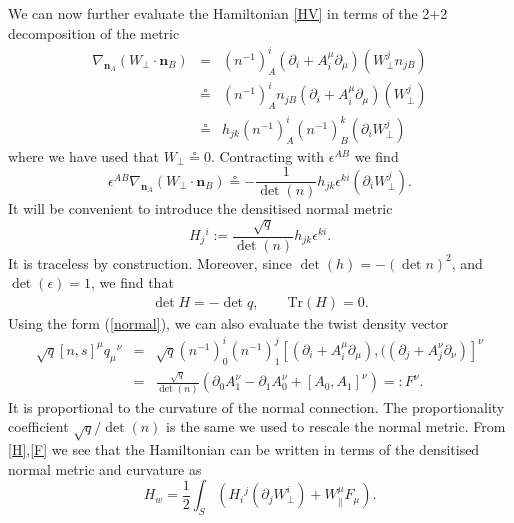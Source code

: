 \documentclass[a4paper,11pt]{article}
\newcommand{\be}{\begin{equation}}
\newcommand{\ee}{\end{equation}}
\newcommand{\beq}{\begin{eqnarray}}
\newcommand{\eeq}{\end{eqnarray}}
\newcommand{\bea}{\begin{eqnarray}}
\newcommand{\eea}{\end{eqnarray}}
\def\n{\bm{n}}
\newcommand{\Tr}{\mbox{Tr}}
\begin{document}
We can now further evaluate the Hamiltonian \eqref{HV} in terms of the 2+2 decomposition of the metric
\bea
\nabla_{\n_A}({W}_\perp\!\cdot\!\n_B) &=&(n^{-1})^{i}_{A}(\partial_{i}+A_{i}^\mu \partial_\mu)({W}^{j}_\perp n_{j B}) \nonumber \\
& \circeq &(n^{-1})^{i}_A n_{j B}(\partial_{i}+ A_{i}^\mu \partial_\mu)({W}^{j}_\perp ) \nonumber \\
& \circeq &h_{jk}(n^{-1})^{i}_A (n^{-1})^{k}_B
(\partial_{i} {W}^{j}_\perp  )
\eea
where we have used that $W_\perp \circeq 0$. 
Contracting with $\epsilon^{AB}$ we find
\begin{equation}
\epsilon^{AB} \nabla_{\n_A}({W}_\perp\!\cdot\!\n_B)
\circeq -\frac{1}{{\det(n)}}h_{jk}\epsilon^{ki} (\partial_{i} {W}^{j}_\perp  ).
\end{equation}
It will be convenient to introduce the densitised normal metric 
\be\label{H}
H_{j}{}^i :=
\frac{\sqrt{q}}{\det(n)} h_{jk}\epsilon^{ki}.
\ee
It is traceless by construction. 
Moreover, since $\det(h) = -(\det n)^2$, and $\det(\epsilon)=1$, we find that
\beq
\det H = -\det q,\qquad \Tr(H) =0.
\eeq
Using the form (\ref{normal}), we can also evaluate the twist density vector
\bea
\sqrt{q} [n,s]^\mu q_\mu{}^\nu  &=&  \sqrt{q} (n^{-1})^{i}_{0}(n^{-1})^{j}_{1} [(\partial_{i}+A_{i}^\mu \partial_\mu),((\partial_{j}+A_{j}^\nu \partial_\nu)]^\nu \\
&=& \frac{\sqrt{q}}{\det({n})}
\left(\partial_{0}A_1^\nu - \partial_1 A_0^\nu +[A_{0}, A_1]^\nu \right) =: F^\nu.\label{F}
\eea
It is proportional to  the curvature of the normal connection.
The proportionality coefficient ${\sqrt{q}}/{\det({n})}$ is the same we used to rescale the normal metric.
From \eqref{H},\eqref{F} we see that the Hamiltonian can be written in terms of the densitised normal metric and curvature as 
\be
H_{w} =\frac12\int_{S} 
\left( H_i{}^j
(\partial_{j}{W}^{i}_\perp  )
 +{W}^{\mu}_\parallel F_{\mu}\right) .
\ee
\end{document}
